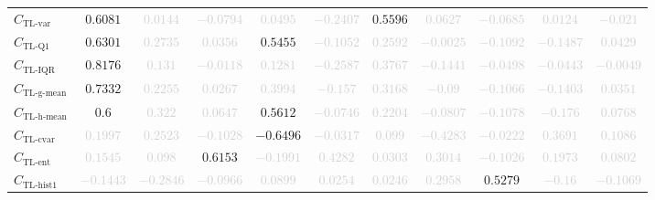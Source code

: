\documentclass{standalone}
\newcommand{\tlvarname}{\text{TL-var}}
\newcommand{\tlvar}{C_{\tlvarname}}
\newcommand{\tlqonename}{\text{TL-Q1}}
\newcommand{\tlqone}{C_{\tlqonename}}
\newcommand{\tliqrname}{\text{TL-IQR}}
\newcommand{\tliqr}{C_{\tliqrname}}
\newcommand{\tlgmeanname}{\text{TL-g-mean}}
\newcommand{\tlgmean}{C_{\tlgmeanname}}
\newcommand{\tlhmeanname}{\text{TL-h-mean}}
\newcommand{\tlhmean}{C_{\tlhmeanname}}
\newcommand{\tlcvariationname}{\text{TL-cvar}}
\newcommand{\tlcvariation}{C_{\tlcvariationname}}
\newcommand{\tlentropyname}{\text{TL-ent}}
\newcommand{\tlentropy}{C_{\tlentropyname}}
\newcommand{\tlhistonename}{\text{TL-hist1}}
\newcommand{\tlhistone}{C_{\tlhistonename}}
\begin{document}
\begin{tabular}{lcccccccccc}
$\tlvar$ & $0.6081$ & \textcolor{lightgray}{$0.0144$} & \textcolor{lightgray}{$-0.0794$} & \textcolor{lightgray}{$0.0495$} & \textcolor{lightgray}{$-0.2407$} & $0.5596$ & \textcolor{lightgray}{$0.0627$} & \textcolor{lightgray}{$-0.0685$} & \textcolor{lightgray}{$0.0124$} & \textcolor{lightgray}{$-0.021$} \\ 
$\tlqone$ & $0.6301$ & \textcolor{lightgray}{$0.2735$} & \textcolor{lightgray}{$0.0356$} & $0.5455$ & \textcolor{lightgray}{$-0.1052$} & \textcolor{lightgray}{$0.2592$} & \textcolor{lightgray}{$-0.0025$} & \textcolor{lightgray}{$-0.1092$} & \textcolor{lightgray}{$-0.1487$} & \textcolor{lightgray}{$0.0429$} \\ 
$\tliqr$ & $0.8176$ & \textcolor{lightgray}{$0.131$} & \textcolor{lightgray}{$-0.0118$} & \textcolor{lightgray}{$0.1281$} & \textcolor{lightgray}{$-0.2587$} & \textcolor{lightgray}{$0.3767$} & \textcolor{lightgray}{$-0.1441$} & \textcolor{lightgray}{$-0.0498$} & \textcolor{lightgray}{$-0.0443$} & \textcolor{lightgray}{$-0.0049$} \\ 
$\tlgmean$ & $0.7332$ & \textcolor{lightgray}{$0.2255$} & \textcolor{lightgray}{$0.0267$} & \textcolor{lightgray}{$0.3994$} & \textcolor{lightgray}{$-0.157$} & \textcolor{lightgray}{$0.3168$} & \textcolor{lightgray}{$-0.09$} & \textcolor{lightgray}{$-0.1066$} & \textcolor{lightgray}{$-0.1403$} & \textcolor{lightgray}{$0.0351$} \\ 
$\tlhmean$ & $0.6$ & \textcolor{lightgray}{$0.322$} & \textcolor{lightgray}{$0.0647$} & $0.5612$ & \textcolor{lightgray}{$-0.0746$} & \textcolor{lightgray}{$0.2204$} & \textcolor{lightgray}{$-0.0807$} & \textcolor{lightgray}{$-0.1078$} & \textcolor{lightgray}{$-0.176$} & \textcolor{lightgray}{$0.0768$} \\ 
$\tlcvariation$ & \textcolor{lightgray}{$0.1997$} & \textcolor{lightgray}{$0.2523$} & \textcolor{lightgray}{$-0.1028$} & $-0.6496$ & \textcolor{lightgray}{$-0.0317$} & \textcolor{lightgray}{$0.099$} & \textcolor{lightgray}{$-0.4283$} & \textcolor{lightgray}{$-0.0222$} & \textcolor{lightgray}{$0.3691$} & \textcolor{lightgray}{$0.1086$} \\ 
$\tlentropy$ & \textcolor{lightgray}{$0.1545$} & \textcolor{lightgray}{$0.098$} & $0.6153$ & \textcolor{lightgray}{$-0.1991$} & \textcolor{lightgray}{$0.4282$} & \textcolor{lightgray}{$0.0303$} & \textcolor{lightgray}{$0.3014$} & \textcolor{lightgray}{$-0.1026$} & \textcolor{lightgray}{$0.1973$} & \textcolor{lightgray}{$0.0802$} \\ 
$\tlhistone$ & \textcolor{lightgray}{$-0.1443$} & \textcolor{lightgray}{$-0.2846$} & \textcolor{lightgray}{$-0.0966$} & \textcolor{lightgray}{$0.0899$} & \textcolor{lightgray}{$0.0254$} & \textcolor{lightgray}{$0.0246$} & \textcolor{lightgray}{$0.2958$} & $0.5279$ & \textcolor{lightgray}{$-0.16$} & \textcolor{lightgray}{$-0.1069$} \\ 

\end{tabular}
\end{document}

